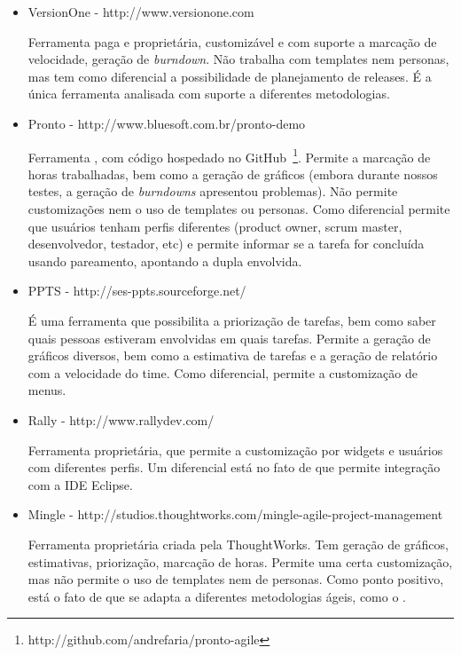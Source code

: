 \begin{itemize}
\item{VersionOne - http://www.versionone.com

Ferramenta paga  e proprietária, customizável e com suporte a marcação de velocidade, geração de \textit{burndown}. Não trabalha
com templates nem personas, mas tem como diferencial a possibilidade de planejamento de releases. É a única ferramenta analisada
com suporte a diferentes metodologias.}

\item{Pronto - http://www.bluesoft.com.br/pronto-demo

Ferramenta \opensource, com código hospedado no GitHub~\footnote{http://github.com/andrefaria/pronto-agile}.
Permite a marcação de horas trabalhadas, bem como a geração de gráficos (embora durante nossos testes, a geração de \textit{burndowns} apresentou problemas). Não permite customizações nem o uso de templates ou personas. Como
diferencial permite que usuários tenham perfis diferentes (product owner, scrum master, desenvolvedor, testador, etc) e
permite informar se a tarefa for concluída usando pareamento, apontando a dupla envolvida.}

\item{PPTS - http://ses-ppts.sourceforge.net/

É uma ferramenta \opensource que possibilita a priorização de tarefas, bem como saber quais pessoas estiveram envolvidas
em quais tarefas. Permite a geração de gráficos diversos, bem como a estimativa de tarefas e a geração de relatório com
a velocidade do time. Como diferencial, permite a customização de menus.}

\item{Rally - http://www.rallydev.com/

Ferramenta proprietária, que permite a customização por widgets e usuários com diferentes perfis. Um diferencial está
no fato de que permite integração com a IDE Eclipse.}

\item{Mingle - http://studios.thoughtworks.com/mingle-agile-project-management

Ferramenta proprietária criada pela ThoughtWorks. Tem geração de gráficos, estimativas, priorização, marcação de horas.
Permite uma certa customização, mas não permite o uso de templates nem de personas. Como ponto positivo, está o fato de
que se adapta a diferentes metodologias ágeis, como o \calopsita.}

\end{itemize}

